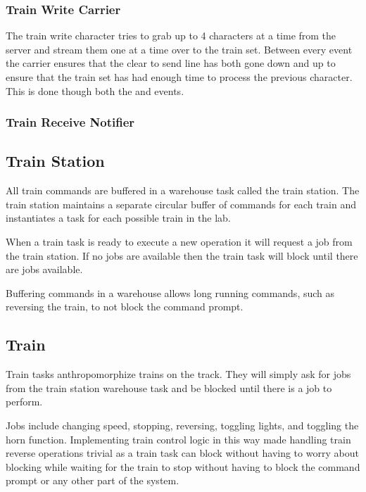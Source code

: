 \documentclass[pdftex,10pt,a4paper]{article}
\begin{document}
\subsubsection*{Train Write Carrier}

The train write character tries to grab up to 4 characters at a time from the
server and stream them one at a time over to the train set. Between every
 event the carrier ensures that the clear to send line has
both gone down and up to ensure that the train set has had enough time to
process the previous character. This is done though both the 
and  events.

\subsubsection*{Train Receive Notifier}


\subsection*{Train Station}

All train commands are buffered in a warehouse task called the train
station. The train station maintains a separate circular buffer of
commands for each train and instantiates a  task for each
possible train in the lab.

When a train task is ready to execute a new operation it will request
a job from the train station. If no jobs are available then the train
task will block until there are jobs available.

Buffering commands in a warehouse allows long running commands, such
as reversing the train, to not block the command prompt.


\subsection*{Train}

Train tasks anthropomorphize trains on the track. They will simply ask
for jobs from the train station warehouse task and be blocked until
there is a job to perform.

Jobs include changing speed, stopping, reversing, toggling lights, and
toggling the horn function. Implementing train control logic in this
way made handling train reverse operations trivial as a train task can
block without having to worry about blocking while waiting for the
train to stop without having to block the command prompt or any
other part of the system.
\end{document}
